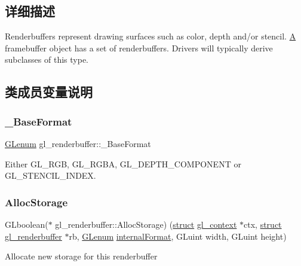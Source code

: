 \subsection{详细描述}
Renderbuffers represent drawing surfaces such as color, depth and/or stencil. \hyperlink{struct_a}{A} framebuffer object has a set of renderbuffers. Drivers will typically derive subclasses of this type. 

\subsection{类成员变量说明}
\mbox{\label{structgl__renderbuffer_a01b2be097f81607c3e646ffda0a2c961}} 
\subsubsection{\texorpdfstring{\+\_\+\+Base\+Format}{\_BaseFormat}}
{\footnotesize\ttfamily \hyperlink{interfacevoid}{G\+Lenum} gl\+\_\+renderbuffer\+::\+\_\+\+Base\+Format}

Either G\+L\+\_\+\+R\+GB, G\+L\+\_\+\+R\+G\+BA, G\+L\+\_\+\+D\+E\+P\+T\+H\+\_\+\+C\+O\+M\+P\+O\+N\+E\+NT or G\+L\+\_\+\+S\+T\+E\+N\+C\+I\+L\+\_\+\+I\+N\+D\+EX. \mbox{\label{structgl__renderbuffer_a0f2ab4bf0d4e3343c76e67b0305b7f93}} 
\subsubsection{\texorpdfstring{Alloc\+Storage}{AllocStorage}}
{\footnotesize\ttfamily G\+Lboolean($\ast$ gl\+\_\+renderbuffer\+::\+Alloc\+Storage) (\hyperlink{interfacestruct}{struct} \hyperlink{structgl__context}{gl\+\_\+context} $\ast$ctx, \hyperlink{interfacestruct}{struct} \hyperlink{structgl__renderbuffer}{gl\+\_\+renderbuffer} $\ast$rb, \hyperlink{interfacevoid}{G\+Lenum} \hyperlink{interfacevoid}{internal\+Format}, G\+Luint width, G\+Luint height)}

Allocate new storage for this renderbuffer \mbox{\label{structgl__renderbuffer_a96d9b2ec2725f6ef30b097c7771fe89c}} 
